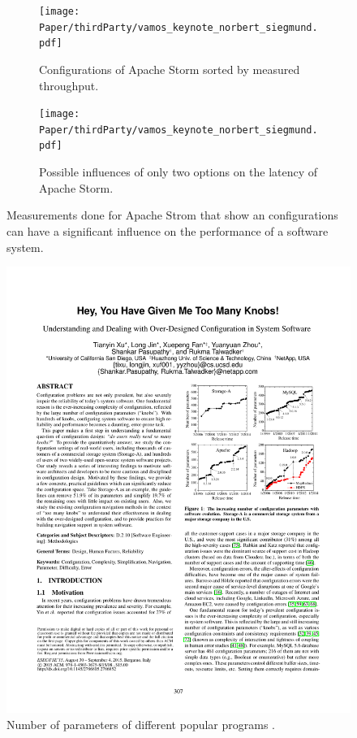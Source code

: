 \begin{figure}[h]
	\begin{subfigure}{.45\linewidth}
		\centering
		\texttt{[image: Paper/thirdParty/vamos\_keynote\_norbert\_siegmund.pdf]}
		\caption{Configurations of Apache Storm sorted by measured throughput.}
		\label{fig:ApacheStorma}
	\end{subfigure}\hspace{.1\linewidth}
	\begin{subfigure}{.45\linewidth}
		\centering
		\texttt{[image: Paper/thirdParty/vamos\_keynote\_norbert\_siegmund.pdf]}
		\caption{Possible influences of only two options on the latency of Apache Storm. }
		\label{fig:ApacheStormb}
	\end{subfigure}
	\caption{Measurements done for Apache Strom that show an configurations can have a significant influence on the performance of a software system.}
	\label{fig:ApacheStorm}
\end{figure}
\begin{figure}[h!]
	\centering
	\includegraphics[clip,trim= 11cm 13cm 2cm 7cm]{Paper/thirdParty/HeyYouHaveGivenMeTooManyKnobs.pdf}
	\caption{Number of parameters of different popular programs \cite{YouveGivenMeTooManyKnobs}.}
	\label{fig:paramters}
\end{figure}
 
